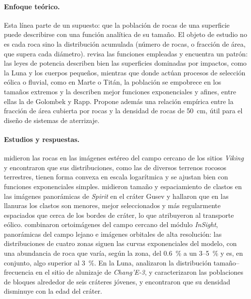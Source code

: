 \paragraph{Enfoque teórico.} Esta línea parte de un supuesto: que la población de rocas de una
superficie puede describirse con una función analítica de su tamaño. El objeto de estudio no
es cada roca sino la distribución acumulada (número de rocas, o fracción de área, que supera
cada diámetro). \citet{lorenz2023analytic} revisa las funciones empleadas y encuentra un
patrón: las leyes de potencia describen bien las superficies dominadas por impactos, como la
Luna y los cuerpos pequeños, mientras que donde actúan procesos de selección eólica o fluvial,
como en Marte o Titán, la población se empobrece en los tamaños extremos y la describen mejor
funciones exponenciales y afines, entre ellas la de Golombek y Rapp. Propone además una
relación empírica entre la fracción de área cubierta por rocas y la densidad de rocas de
\SI{50}{\centi\metre}, útil para el diseño de sistemas de aterrizaje.

\paragraph{Estudios y respuestas.} \citet{golombek1997rocks} midieron las rocas en las
imágenes estéreo del campo cercano de los sitios \textit{Viking} y encontraron que sus
distribuciones, como las de diversos terrenos rocosos terrestres, tienen forma convexa en
escala logarítmica y se ajustan bien con funciones exponenciales simples. \citet{ward2005spirit}
midieron tamaño y espaciamiento de clastos en las imágenes panorámicas de \textit{Spirit} en
el cráter Gusev y hallaron que en las llanuras los clastos son menores, mejor seleccionados y
más regularmente espaciados que cerca de los bordes de cráter, lo que atribuyeron al
transporte eólico. \citet{golombek2021insight} combinaron ortoimágenes del campo cercano del
módulo \textit{InSight}, panorámicas del campo lejano e imágenes orbitales de alta resolución:
las distribuciones de cuatro zonas siguen las curvas exponenciales del modelo, con una
abundancia de roca que varía, según la zona, del \SI{0.6}{\percent} a un 3--\SI{5}{\percent} y es, en
conjunto, algo superior al \SI{3}{\percent}. En la Luna, \citet{di2016change3} analizaron la
distribución tamaño--frecuencia en el sitio de alunizaje de \textit{Chang'E-3}, y
\citet{watkins2019boulder} caracterizaron las poblaciones de bloques alrededor de seis cráteres
jóvenes, y encontraron que su densidad disminuye con la edad del cráter.

